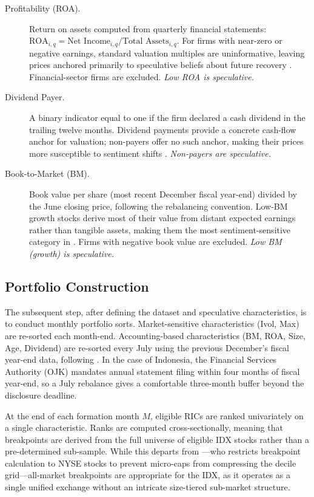 \documentclass[
	a4paper,
	10pt,
	twoside,
]{LTJournalArticle}
\begin{document}
\begin{description}
  \item[Profitability (ROA).]
  Return on assets computed from quarterly financial statements:
  $\text{ROA}_{i,q} = \text{Net Income}_{i,q} / \text{Total Assets}_{i,q}$.
  For firms with near-zero or negative earnings, standard valuation multiples
  are uninformative, leaving prices anchored primarily to speculative beliefs
  about future recovery \citep{baker2006}. Financial-sector firms are excluded.
  \textit{Low ROA is speculative.}

  \item[Dividend Payer.]
  A binary indicator equal to one if the firm declared a cash dividend in the
  trailing twelve months. Dividend payments provide a concrete cash-flow anchor
  for valuation; non-payers offer no such anchor, making their prices more
  susceptible to sentiment shifts \citep{baker2004}.
  \textit{Non-payers are speculative.}

  \item[Book-to-Market (BM).]
  Book value per share (most recent December fiscal year-end) divided by the
  June closing price, following the \citet{fama1993} rebalancing convention.
  Low-BM growth stocks derive most of their value from distant expected
  earnings rather than tangible assets, making them the most sentiment-sensitive
  category in \citet{baker2006}. Firms with negative book value are excluded.
  \textit{Low BM (growth) is speculative.}

  \end{description}

\subsection{Portfolio Construction}

The subsequent step, after defining the dataset and speculative characteristics, is to conduct monthly portfolio sorts. Market-sensitive characteristics (Ivol, Max) are re-sorted each month-end. Accounting-based characteristics (BM, ROA, Size, Age, Dividend) are re-sorted every July using the previous December's fiscal year-end data, following \citet{fama1993}. In the case of Indonesia, the Financial Services Authority (OJK) mandates annual statement filing within four months of fiscal year-end, so a July rebalance gives a comfortable three-month buffer beyond the disclosure deadline.

At the end of each formation month $M$, eligible RICs are ranked univariately on a single characteristic. Ranks are computed cross-sectionally, meaning that breakpoints are derived from the full universe of eligible IDX stocks rather than a pre-determined sub-sample. While this departs from \citet{birru2018}---who restricts breakpoint calculation to NYSE stocks to prevent micro-caps from compressing the decile grid---all-market breakpoints are appropriate for the IDX, as it operates as a single unified exchange without an intricate size-tiered sub-market structure.
\end{document}

